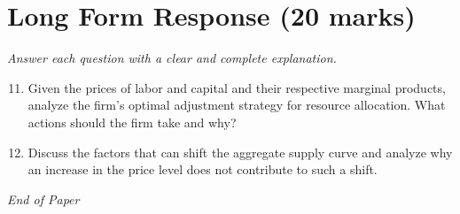 \documentclass[12pt]{article}
\begin{document}
\section*{Long Form Response (20 marks)}
\textit{Answer each question with a clear and complete explanation.}
\begin{enumerate}[label=\arabic*.]
\setcounter{enumi}{10}
\item Given the prices of labor and capital and their respective marginal products, analyze the firm's optimal adjustment strategy for resource allocation. What actions should the firm take and why?
\item Discuss the factors that can shift the aggregate supply curve and analyze why an increase in the price level does not contribute to such a shift.
\end{enumerate}

\vfill
\noindent\textit{End of Paper}
\end{document}
